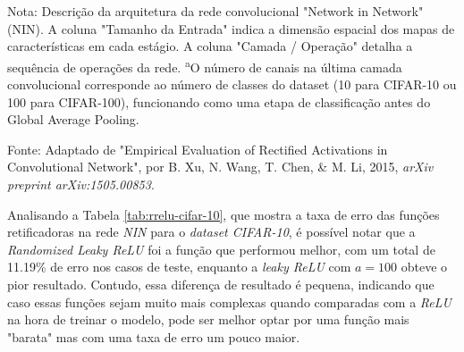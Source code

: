 \begin{table}[ht]
\begin{threeparttable}
        \begin{tablenotes}[para]
            \small
            \item[] Nota: Descrição da arquitetura da rede convolucional "Network in Network" (NIN). A coluna "Tamanho da Entrada" indica a dimensão espacial dos mapas de características em cada estágio. A coluna "Camada / Operação" detalha a sequência de operações da rede. \textsuperscript{a}O número de canais na última camada convolucional corresponde ao número de classes do dataset (10 para CIFAR-10 ou 100 para CIFAR-100), funcionando como uma etapa de classificação antes do Global Average Pooling.
            \item[] Fonte: Adaptado de "Empirical Evaluation of Rectified Activations in Convolutional Network", por B. Xu, N. Wang, T. Chen, \& M. Li, 2015, \textit{arXiv preprint arXiv:1505.00853}.
        \end{tablenotes}
        
    \end{threeparttable}
\end{table}

Analisando a Tabela \ref{tab:rrelu-cifar-10}, que mostra a taxa de erro das funções retificadoras na rede \textit{NIN} para o \textit{dataset CIFAR-10}, é possível notar que a \textit{Randomized Leaky ReLU} foi a função que performou melhor, com um total de 11.19\% de erro nos casos de teste, enquanto a \textit{leaky ReLU} com $a = 100$ obteve o pior resultado. Contudo, essa diferença de resultado é pequena, indicando que caso essas funções sejam muito mais complexas quando comparadas com a \textit{ReLU} na hora de treinar o modelo, pode ser melhor optar por uma função mais "barata" mas com uma taxa de erro um pouco maior.

